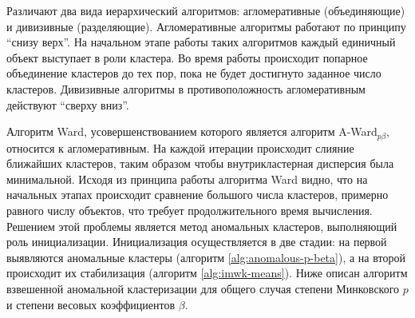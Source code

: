 \documentclass[12pt]{a&t}
\begin{document}
Различают два вида иерархический  алгоритмов: агломеративные (объединяющие) и дивизивные (разделяющие). Агломеративные алгоритмы работают по принципу ``снизу верх''. На начальном этапе работы таких алгоритмов каждый единичный объект выступает в роли кластера. Во время работы происходит попарное объединение кластеров до тех пор, пока не будет достигнуто заданное число кластеров. Дивизивные алгоритмы в противоположность агломеративным действуют ``сверху вниз''.

Алгоритм Ward, усовершенствованием которого является алгоритм \mbox{A-Ward$ _{p\beta} $}, относится к агломеративным. На каждой итерации происходит слияние ближайших кластеров, таким образом чтобы внутрикластерная дисперсия была минимальной. Исходя из принципа работы алгоритма Ward видно, что на начальных этапах происходит сравнение большого числа кластеров, примерно равного числу объектов, что требует продолжительного время вычисления. Решением этой проблемы является метод аномальных кластеров, выполняющий роль инициализации. Инициализация осуществляется в две стадии: на первой выявляются аномальные кластеры (алгоритм \ref{alg:anomalous-p-beta}), а на второй происходит их стабилизация (алгоритм \ref{alg:imwk-means}). Ниже описан алгоритм взвешенной аномальной кластеризации для общего случая степени Минковского $ p $ и степени весовых коэффициентов $ \beta $.
\end{document}
